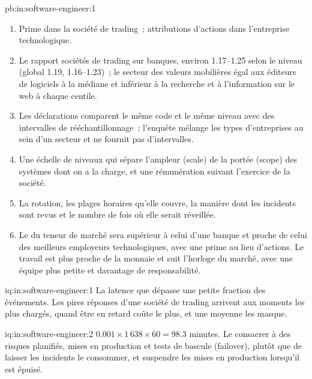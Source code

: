 \begin{solution}{pb:in:software-engineer:1}
\begin{enumerate}
inférieur à 1 à chaque centile (0.77 à la médiane).
\item Prime dans la société de trading~; attributions d'actions dans l'entreprise technologique.
\item Le rapport sociétés de trading sur banques, environ 1.17--1.25 selon le niveau (global 1.19, 1.16--1.23)~; le secteur des valeurs mobilières égal aux
éditeurs de logiciels à la médiane et inférieur à la recherche et à l'information sur le web à chaque centile.
\item Les déclarations comparent le même code et le même niveau avec des intervalles de rééchantillonnage~; l'enquête mélange les types d'entreprises au sein d'un
secteur et ne fournit pas d'intervalles.
\item Une échelle de niveaux qui sépare l'ampleur (scale) de la portée (scope) des systèmes dont on a la charge, et une rémunération suivant l'exercice de la société.
\item La rotation, les plages horaires qu'elle couvre, la manière dont les incidents sont revus et le nombre de fois où elle serait réveillée.
\item Le  du teneur de marché sera supérieur à celui d'une banque et proche de celui des meilleurs employeurs technologiques, avec
une prime au lieu d'actions. Le travail est plus proche de la monnaie et suit l'horloge du marché, avec une équipe plus petite et davantage
de responsabilité.
\end{enumerate}
\end{solution}

\begin{solution}{iq:in:software-engineer:1}
La latence que dépasse une petite fraction des événements. Les pires réponses d'une société de trading arrivent aux moments les plus chargés, quand être
en retard coûte le plus, et une moyenne les masque.
\end{solution}

\begin{solution}{iq:in:software-engineer:2}
$0.001\times1\,638\times60=98.3$ minutes. Le consacrer à des risques planifiés, mises en production et tests de bascule (failover), plutôt que de laisser les incidents
le consommer, et suspendre les mises en production lorsqu'il est épuisé.
\end{solution}

